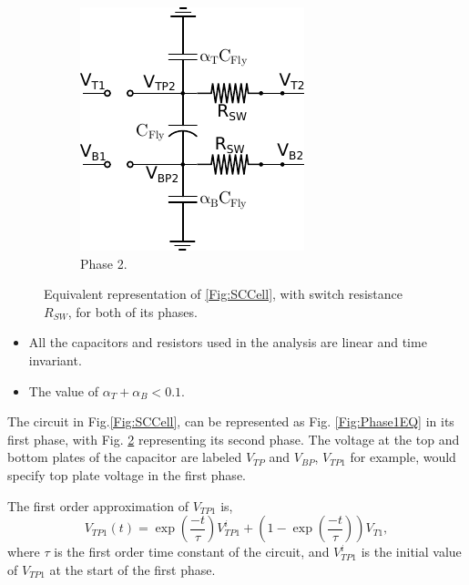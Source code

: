 \documentclass[conference]{IEEEtran}
\begin{document}
\begin{figure}
\begin{subfigure}{0.43\linewidth}
			\includegraphics[width=\linewidth]{Figures/Phase2EQ.pdf}
			\caption{Phase 2.}
			\label{Fig:Phase2EQ}
		\end{subfigure}
		\caption{Equivalent representation of \ref{Fig:SCCell}, with switch resistance $R_{SW}$, for both of its phases.}
	\end{figure}
	
	\begin{itemize}
		\item All the capacitors and resistors used in the analysis are linear and time invariant.
		\item The value of $\alpha_T + \alpha_B < 0.1$.
	\end{itemize}
	The circuit in Fig.\ref{Fig:SCCell}, can be represented as Fig. \ref{Fig:Phase1EQ} in its first phase, with Fig. \ref{Fig:Phase2EQ} representing its second phase. The voltage at the top and bottom plates of the capacitor are labeled $V_{TP}$ and $V_{BP}$, $V_{TP1}$ for example, would specify top plate voltage in the first phase.
	
	
	
	
	The first order approximation of $V_{TP1}$ is,
	\begin{equation}
	V_{TP1}(t) = \exp\left(\frac{-t}{\tau}\right)V_{TP1}^{i} + \left(1 - \exp\left(\frac{-t}{\tau}\right)\right)V_{T1},
	\end{equation}
	where $\tau$ is the first order time constant of the circuit, and $V_{TP1}^i$ is the initial value of $V_{TP1}$ at the start of the first phase. 
	
\end{document}

